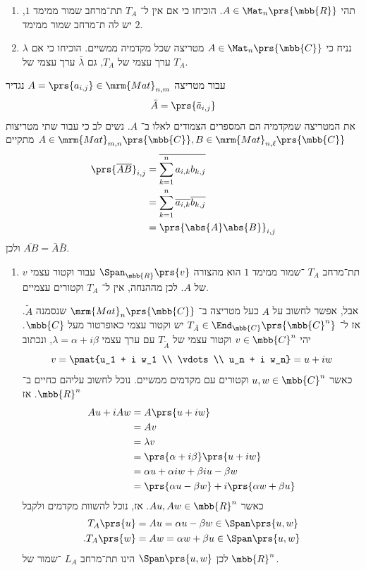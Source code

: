 \documentclass[a4paper,10pt,twoside,openany]{book}
\begin{document}
\begin{exercise}
\begin{enumerate}
\item תהי
$A \in \Mat_n\prs{\mbb{R}}$.
הוכיחו כי אם אין ל־%
$T_A$
תת־מרחב שמור ממימד
$1$,
יש לה ת־מרחב שמור ממימד
$2$.
\item נניח כי
$A \in \Mat_n\prs{\mbb{C}}$
מטריצה שכל מקדמיה ממשיים. הוכיחו כי אם
$\lambda$
ערך עצמי של
$T_A$,
גם
$\bar{\lambda}$
ערך עצמי של
$T_A$.
\end{enumerate}
\end{exercise}

\begin{solution}
עבור מטריצה
$A = \prs{a_{i,j}} \in \mrm{Mat}_{n, m}$
נגדיר
\[\bar{A} = \prs{\bar{a}_{i,j}}\]
את המטריצה שמקדמיה הם המספרים הצמודים לאלו ב־%
$A$.
נשים לב כי עבור שתי מטריצות
$A \in \mrm{Mat}_{m,n}\prs{\mbb{C}}, B \in \mrm{Mat}_{n,\ell}\prs{\mbb{C}}$
מתקיים
\begin{align*}
\prs{\overline{AB}}_{i,j} &= \overline{\sum_{k = 1}^n a_{i,k} b_{k,j}}
\\&= \sum_{k=1}^n \overline{a_{i,k}} \overline{b_{k,j}}
\\&= \prs{\abs{A} \abs{B}}_{i,j}
\end{align*}
ולכן
$\overline{AB} = \bar{A} \bar{B}$.

\begin{enumerate}
\item
תת־מרחב
$T_A$%
־שמור ממימד
$1$
הוא מהצורה
$\Span_{\mbb{R}}\prs{v}$
עבור וקטור עצמי
$v$
של
$A$.
לכן מההנחה, אין ל־%
$T_A$
וקטורים עצמיים.

אבל, אפשר לחשוב על
$A$
כעל מטריצה ב־%
$\mrm{Mat}_n\prs{\mbb{C}}$
שנסמנה
$\tilde{A}$.
אז ל־%
$T_{\tilde{A}} \in \End_{\mbb{C}}\prs{\mbb{C}^n}$
יש וקטור עצמי כאופרטור מעל
$\mbb{C}$.
יהי
$v \in \mbb{C}^n$
וקטור עצמי של
$T_{\tilde{A}}$
עם ערך עצמי
$\lambda = \alpha + i \beta$,
ונכתוב
\[v = \pmat{u_1 + i w_1 \\ \vdots \\ u_n + i w_n} = u + iw\]
כאשר
$u,w \in \mbb{C}^n$
וקטורים עם מקדמים ממשיים. נוכל לחשוב עליהם כחיים ב־%
$\mbb{R}^n$.
אז
\begin{align*}
Au + iAw &= A\prs{u + iw}
\\&= Av
\\&= \lambda v
\\&= \prs{\alpha + i \beta} \prs{u + iw}
\\&= \alpha u + \alpha i w + \beta i u - \beta w
\\&= \prs{\alpha u - \beta w} + i\prs{\alpha w + \beta u}
\end{align*}
כאשר
$Au, Aw \in \mbb{R}^n$.
אז, נוכל להשוות מקדמים ולקבל
\begin{align*}
T_A\prs{u} &= Au = \alpha u - \beta w \in \Span\prs{u,w} \\
\text{.} T_A\prs{w} &= Aw =  \alpha w + \beta u \in \Span\prs{u,w}
\end{align*}
לכן
$\Span\prs{u,w}$
הינו תת־מרחב
$L_A$%
־שמור של
$\mbb{R}^n$.


\end{enumerate}
\end{solution}
\end{document}
